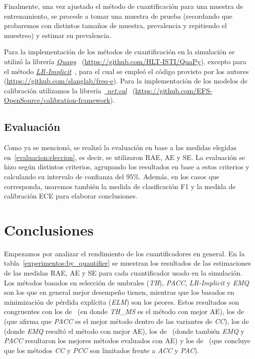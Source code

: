 Finalmente, una vez ajustado el método de cuantificación para una muestra de
entrenamiento, se procede a tomar una muestra de prueba (recordando que
probaremos con distintos tamaños de muestra, prevalencia y repitiendo el
muestreo) y estimar su prevalencia.

Para la implementación de los métodos de cuantificación en la simulación se
utilizó la librería \href{https://github.com/HLT-ISTI/QuaPy}{{\it
Quapy}}~\cite{moreo2021quapy} (\url{https://github.com/HLT-ISTI/QuaPy}), excepto
para el método \href{https://github.com/slanglab/freq-e}{{\it
LR-Implicit}}~\cite{keith2018uncertainty}, para el cual se empleó el código
provisto por los autores (\url{https://github.com/slanglab/freq-e}). Para la
implementación de los modelos de calibración utilizamos la
librería~\href{https://github.com/EFS-OpenSource/calibration-framework}{{\it
net:cal}}~\cite{kuppers2020multivariate}
(\url{https://github.com/EFS-OpenSource/calibration-framework}).

\subsection{Evaluación}\label{experimentos:evaluación}

Como ya se mencionó, se realizó la evaluación en base a las medidas elegidas
en~\ref{evaluacion:eleccion}, es decir, se utilizaron RAE, AE y SE. La
evaluación se hizo según distintos criterios, agrupando los resultados en base a
estos criterios y calculando su intervalo de confianza del 95\%. Además, en los
casos que corresponda, usaremos también la medida de clasificación F1 y la
medida de calibración ECE para elaborar conclusiones.

\section{Conclusiones}\label{experimentos:conclusiones}

Empezamos por analizar el rendimiento de los cuantificadores en general. En la
tabla~\ref{experimentos:by_quantifier} se muestran los resultados de las
estimaciones de las medidas RAE, AE y SE para cada cuantificador usado en la
simulación. Los métodos basados en selección de umbrales ({\it TH\/}), {\it
PACC\/}, {\it LR-Implicit\/} y {\it EMQ\/} son los que en general mejor
desempeño tienen, mientras que los basados en minimización de pérdida explícita
({\it ELM\/}) son los peores. Estos resultados son congruentes con los
de~\citet{schumacher2021comparative} (en donde {\it TH\_MS\/} es el método con
mejor AE), los de~\citet{moreo2021re} (que afirma que {\it PACC\/} es el mejor
método dentro de las variantes de {\it CC\/}), los de~\citet{moreo2021quapy}
(donde {\it EMQ\/} resultó el método con mejor AE), los
de~\citet{moreo2022tweet} (donde también {\it EMQ\/} y {\it PACC\/} resultaron
los mejores métodos evaluados con AE) y los de~\citet{tasche2016does} (que
concluye que los métodos {\it CC\/} y {\it PCC\/} son limitados frente a {\it
ACC\/} y {\it PAC\/}).

